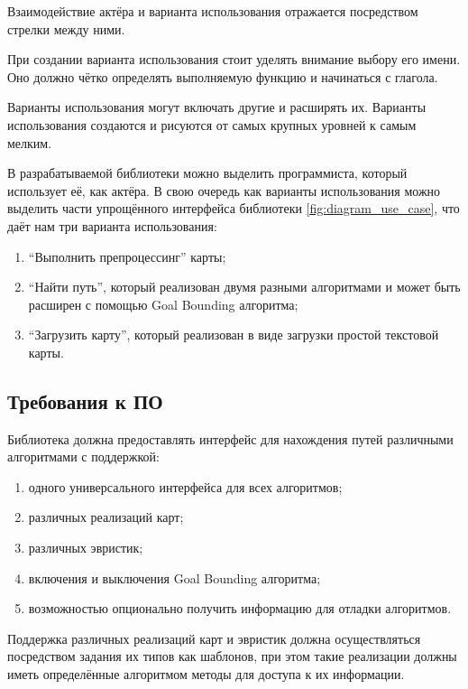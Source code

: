 Взаимодействие актёра и варианта использования отражается посредством стрелки между ними.

При создании варианта использования стоит уделять внимание выбору его имени. Оно должно чётко определять выполняемую функцию и начинаться с глагола. 

Варианты использования могут включать другие и расширять их. Варианты использования создаются и рисуются от самых крупных уровней к самым мелким.

В разрабатываемой библиотеки можно выделить программиста, который использует её, как актёра. В свою очередь как варианты использования можно выделить части упрощённого интерфейса библиотеки \cref{fig:diagram_use_case}, что даёт нам три варианта использования: 

\begin{enumerate}
	\item ``Выполнить препроцессинг'' карты;
	\item ``Найти путь'', который реализован двумя разными алгоритмами и может быть расширен с помощью Goal Bounding алгоритма;
	\item ``Загрузить карту'', который реализован в виде загрузки простой текстовой карты.
\end{enumerate}


\subsection{Требования к ПО}

Библиотека должна предоставлять интерфейс для нахождения путей различными алгоритмами с поддержкой:

\begin{enumerate}
    \item одного универсального интерфейса для всех алгоритмов; 
	\item различных реализаций карт;
	\item различных эвристик;
	\item включения и выключения Goal Bounding алгоритма;
	\item возможностью опционально получить информацию для отладки алгоритмов.
\end{enumerate}

Поддержка различных реализаций карт и эвристик должна осуществляться посредством задания их типов как шаблонов, при этом такие реализации должны иметь определённые алгоритмом методы для доступа к их информации.

